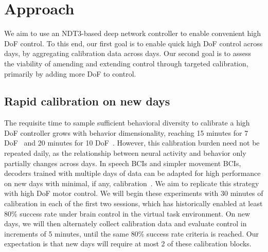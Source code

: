 \documentclass[12pt,oneside]{report}
\begin{document}
\section{Approach}
We aim to use an NDT3-based deep network controller to enable convenient high DoF control. To this end, our first goal is to enable quick high DoF control across days, by aggregating calibration data across days. Our second goal is to assess the viability of amending and extending control through targeted calibration, primarily by adding more DoF to control.


\subsection{Rapid calibration on new days}
The requisite time to sample sufficient behavioral diversity to calibrate a high DoF controller grows with behavior dimensionality, reaching 15 minutes for 7 DoF~\citep{collinger2013high} and 20 minutes for 10 DoF~\citep{wodlinger_15_10d}. However, this calibration burden need not be repeated daily, as the relationship between neural activity and behavior only partially changes across days. In speech BCIs and simpler movement BCIs, decoders trained with multiple days of data can be adapted for high performance on new days with minimal, if any, calibration~\citep{sussillo_16_future,hosman2023months,fan2023plugandplay,card2025long}. We aim to replicate this strategy with high DoF motor control.
We will begin these experiments with 30 minutes of calibration in each of the first two sessions, which has historically enabled at least 80\% success rate under brain control in the virtual task environment. On new days, we will then alternately collect calibration data and evaluate control in increments of 5 minutes, until the same 80\% success rate criteria is reached. Our expectation is that new days will require at most 2 of these calibration blocks.
\end{document}
